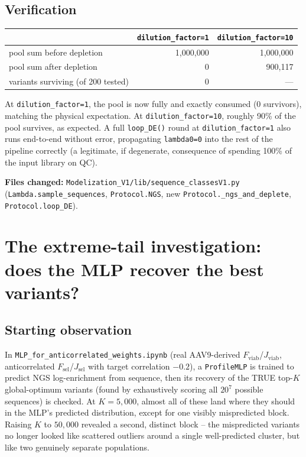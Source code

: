 \documentclass[11pt]{article}
\newcommand{\code}[1]{\texttt{#1}}
\begin{document}
\subsection{Verification}

\begin{center}
\begin{tabular}{lrr}
\hline
 & \code{dilution\_factor=1} & \code{dilution\_factor=10} \\
\hline
pool sum before depletion & 1{,}000{,}000 & 1{,}000{,}000 \\
pool sum after depletion & 0 & 900{,}117 \\
variants surviving (of 200 tested) & 0 & --- \\
\hline
\end{tabular}
\end{center}

At \code{dilution\_factor=1}, the pool is now fully and exactly consumed (0 survivors), matching
the physical expectation. At \code{dilution\_factor=10}, roughly 90\% of the pool survives, as
expected. A full \code{loop\_DE()} round at \code{dilution\_factor=1} also runs end-to-end without
error, propagating \code{lambda0=0} into the rest of the pipeline correctly (a legitimate, if
degenerate, consequence of spending 100\% of the input library on QC).

\textbf{Files changed:} \code{Modelization\_V1/lib/sequence\_classesV1.py}
(\code{Lambda.sample\_sequences}, \code{Protocol.NGS}, new \code{Protocol.\_ngs\_and\_deplete},
\code{Protocol.loop\_DE}).

\section{The extreme-tail investigation: does the MLP recover the best variants?}
\label{sec:fj}

\subsection{Starting observation}

In \code{MLP\_for\_anticorrelated\_weights.ipynb} (real AAV9-derived $F_{\text{viab}}$/$J_{\text{viab}}$,
anticorrelated $F_{\text{sel}}$/$J_{\text{sel}}$ with target correlation $-0.2$), a \code{ProfileMLP}
is trained to predict NGS log-enrichment from sequence, then its recovery of the TRUE top-$K$
global-optimum variants (found by exhaustively scoring all $20^7$ possible sequences) is checked.
At $K=5{,}000$, almost all of these land where they should in the MLP's predicted distribution,
except for one visibly mispredicted block. Raising $K$ to $50{,}000$ revealed a second, distinct
block -- the mispredicted variants no longer looked like scattered outliers around a single
well-predicted cluster, but like two genuinely separate populations.
\end{document}
